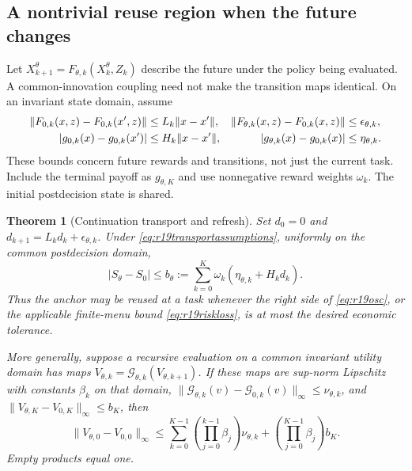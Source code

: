 \documentclass[ecta,nameyear,draft]{econsocart}
\newtheorem{theorem}{Theorem}
\theoremstyle{definition}
\theoremstyle{remark}
\begin{document}
\subsection{A nontrivial reuse region when the future changes}
Let $X_{k+1}^\theta=F_{\theta,k}(X_k^\theta,Z_k)$ describe the future
under the policy being evaluated. A common-innovation coupling need not
make the transition maps identical. On an invariant state domain, assume
\begin{align}
 \|F_{0,k}(x,z)-F_{0,k}(x',z)\|&\leq L_k\|x-x'\|,
 &\|F_{\theta,k}(x,z)-F_{0,k}(x,z)\|&\leq\epsilon_{\theta,k},\notag\\
 |g_{0,k}(x)-g_{0,k}(x')|&\leq H_k\|x-x'\|,
 &|g_{\theta,k}(x)-g_{0,k}(x)|&\leq\eta_{\theta,k}.
 \label{eq:r19transportassumptions}
\end{align}
These bounds concern future rewards and transitions, not just the current
task. Include the terminal payoff as $g_{\theta,K}$ and use nonnegative
reward weights $\omega_k$. The initial postdecision state is shared.

\begin{theorem}[Continuation transport and refresh]
\label{thm:r19transport}
Set $d_0=0$ and
$d_{k+1}=L_kd_k+\epsilon_{\theta,k}$. Under
\eqref{eq:r19transportassumptions}, uniformly on the common postdecision
domain,
\begin{equation}
 |S_\theta-S_0|\leq
 b_\theta:=\sum_{k=0}^{K}\omega_k
                   (\eta_{\theta,k}+H_kd_k).
 \label{eq:r19transport}
\end{equation}
Thus the anchor may be reused at a task whenever the right side of
\eqref{eq:r19osc}, or the applicable finite-menu bound
\eqref{eq:r19riskloss}, is at most the desired economic tolerance.

More generally, suppose a recursive evaluation on a common invariant utility
domain has maps $V_{\theta,k}=\mathcal G_{\theta,k}(V_{\theta,k+1})$.
If these maps are sup-norm Lipschitz with constants $\beta_k$ on that domain,
$\|\mathcal G_{\theta,k}(v)-\mathcal G_{0,k}(v)\|_\infty\leq\nu_{\theta,k}$,
and $\|V_{\theta,K}-V_{0,K}\|_\infty\leq b_K$, then
\begin{equation}
 \|V_{\theta,0}-V_{0,0}\|_\infty\leq
 \sum_{k=0}^{K-1}\left(\prod_{j=0}^{k-1}\beta_j\right)\nu_{\theta,k}
       +\left(\prod_{j=0}^{K-1}\beta_j\right)b_K.
 \label{eq:r19recursive}
\end{equation}
Empty products equal one.
\end{theorem}
\end{document}
